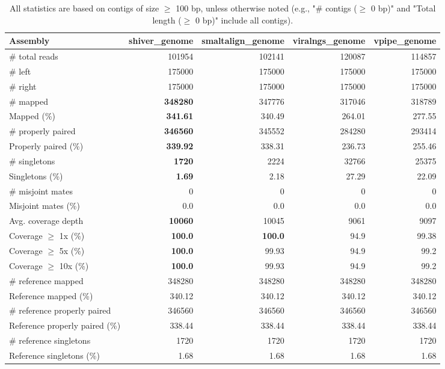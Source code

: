 \documentclass[12pt,a4paper]{article}
\begin{document}
\begin{table}[ht]
\begin{center}
\caption{All statistics are based on contigs of size $\geq$ 100 bp, unless otherwise noted (e.g., "\# contigs ($\geq$ 0 bp)" and "Total length ($\geq$ 0 bp)" include all contigs).}
\begin{tabular}{|l*{4}{|r}|}
\hline
Assembly & shiver\_genome & smaltalign\_genome & viralngs\_genome & vpipe\_genome \\ \hline
\# total reads & 101954 & 102141 & 120087 & 114857 \\ \hline
\# left & 175000 & 175000 & 175000 & 175000 \\ \hline
\# right & 175000 & 175000 & 175000 & 175000 \\ \hline
\# mapped & {\bf 348280} & 347776 & 317046 & 318789 \\ \hline
Mapped (\%) & {\bf 341.61} & 340.49 & 264.01 & 277.55 \\ \hline
\# properly paired & {\bf 346560} & 345552 & 284280 & 293414 \\ \hline
Properly paired (\%) & {\bf 339.92} & 338.31 & 236.73 & 255.46 \\ \hline
\# singletons & {\bf 1720} & 2224 & 32766 & 25375 \\ \hline
Singletons (\%) & {\bf 1.69} & 2.18 & 27.29 & 22.09 \\ \hline
\# misjoint mates & 0 & 0 & 0 & 0 \\ \hline
Misjoint mates (\%) & 0.0 & 0.0 & 0.0 & 0.0 \\ \hline
Avg. coverage depth & {\bf 10060} & 10045 & 9061 & 9097 \\ \hline
Coverage $\geq$ 1x (\%) & {\bf 100.0} & {\bf 100.0} & 94.9 & 99.38 \\ \hline
Coverage $\geq$ 5x (\%) & {\bf 100.0} & 99.93 & 94.9 & 99.2 \\ \hline
Coverage $\geq$ 10x (\%) & {\bf 100.0} & 99.93 & 94.9 & 99.2 \\ \hline
\# reference mapped & 348280 & 348280 & 348280 & 348280 \\ \hline
Reference mapped (\%) & 340.12 & 340.12 & 340.12 & 340.12 \\ \hline
\# reference properly paired & 346560 & 346560 & 346560 & 346560 \\ \hline
Reference properly paired (\%) & 338.44 & 338.44 & 338.44 & 338.44 \\ \hline
\# reference singletons & 1720 & 1720 & 1720 & 1720 \\ \hline
Reference singletons (\%) & 1.68 & 1.68 & 1.68 & 1.68 \\ \hline

\end{tabular}
\end{center}
\end{table}
\end{document}
